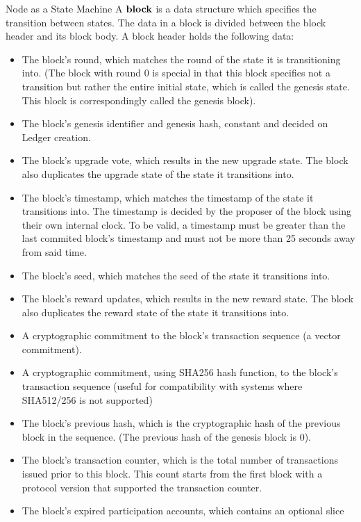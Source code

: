 \documentclass[10pt,a4paper]{article}
\begin{document}
\begin{section}{Node as a State Machine}
A $\bold{block}$ is a data structure which specifies the transition between states.
The data in a block is divided between the block header and its block body.
A block header holds the following data:
\begin{itemize}
    \item The block's round, which matches the round of the state it is transitioning
    into. (The block with round 0 is special in that this block specifies not
    a transition but rather the entire initial state, which is called the genesis
    state. This block is correspondingly called the genesis block).
    \item The block's genesis identifier and genesis hash, constant and decided on
    Ledger creation.
    \item The block's upgrade vote, which results in the new upgrade state. The
    block also duplicates the upgrade state of the state it transitions into.
    \item The block's timestamp, which matches the timestamp of the state it transitions into. 
    The timestamp is decided by the proposer of the block using their own internal clock. 
    To be valid, a timestamp must be greater than the last commited block's timestamp 
    and must not be more than 25 seconds away from said time.
    \item The block's seed, which matches the seed of the state it transitions into.
    \item The block's reward updates, which results in the new reward state. The
    block also duplicates the reward state of the state it transitions into.
    \item A cryptographic commitment to the block's transaction sequence (a vector commitment).
    \item A cryptographic commitment, using SHA256 hash function, to the block's
    transaction sequence (useful for compatibility with systems where SHA512/256 is not supported)
    \item The block's previous hash, which is the cryptographic hash of the previous
    block in the sequence. (The previous hash of the genesis block is 0).
    \item The block's transaction counter, which is the total number of transactions
    issued prior to this block. This count starts from the first block with a
    protocol version that supported the transaction counter.
    \item The block's expired participation accounts, which contains an optional slice

\end{itemize}
\end{section}
\end{document}
